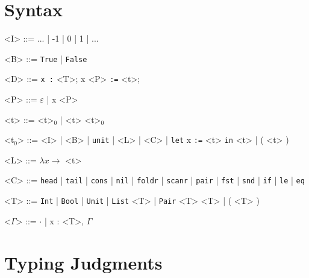 \documentclass[10pt]{article}
\newcommand{\ttt}[1]{\texttt{#1}}
\newcommand{\ra}{\ensuremath{\rightarrow}}
\newcommand{\head}{\ttt{head}}
\newcommand{\tail}{\ttt{tail}}
\newcommand{\cons}{\ttt{cons}}
\newcommand{\nil}{\ttt{nil}}
\newcommand{\foldr}{\ttt{foldr}}
\newcommand{\scanr}{\ttt{scanr}}
\newcommand{\pair}{\ttt{pair}}
\newcommand{\fst}{\ttt{fst}}
\newcommand{\snd}{\ttt{snd}}
\newcommand{\ite}{\ttt{if}}
\newcommand{\lesseq}{\ttt{le}}
\newcommand{\eq}{\ttt{eq}}
\begin{document}
\section{Syntax}

\begin{grammar}
  <I> ::= ... | -1 | 0 | 1 | ...

  <B> ::= \ttt{True} | \ttt{False}

  <D> ::= \ttt{x :} <T>; x <P> \ttt{:=} <t>;

  <P> ::= $\varepsilon$ | x <P>

  <t> ::= <t>$_0$ | <t> <t>$_0$

  <t$_0$> ::= <I> | <B> | \ttt{unit} | <L> | <C> | \ttt{let} x \ttt{:=} <t> \ttt{in} <t> | ( <t> )

  <L> ::= $\lambda x \ra$ <t>

  <C> ::= \head\; | \tail\; | \cons\; | \nil\; | \foldr\; | \scanr\; | \pair\; | \fst\; | \snd\; | \ite\; | \lesseq\; | \eq

  <T> ::= \ttt{Int} | \ttt{Bool} | \ttt{Unit} | \ttt{List} <T> | \ttt{Pair} <T> <T> | ( <T> )

  <$\Gamma$> ::= $\cdot$ | x : <T>, $\Gamma$
\end{grammar}

\section{Typing Judgments}
\end{document}
